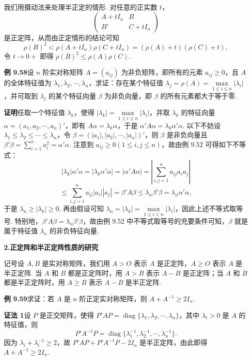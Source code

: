 \documentclass[UTF8, 12pt, fontset=fandol, oneside]{ctexart}
\begin{document}
我们用摄动法来处理半正定的情形. 对任意的正实数 $t$，
\[
\begin{pmatrix}
A+tI_n&B\\
B'&C+tI_n
\end{pmatrix}
\]
是正定阵，从而由正定情形的结论可知
\[
\rho(B)^2<\rho(A+tI_n)\rho(C+tI_n)=(\rho(A)+t)(\rho(C)+t),
\]
令 $t\to0+$ 即得 $\rho(B)^2\le\rho(A)\rho(C)$.

\noindent\textbf{例 9.58}\quad 设 $n$ 阶实对称矩阵 $A=(a_{ij})$ 为非负矩阵，即所有的元素 $a_{ij}\ge0$，且 $A$ 的全体特征值为 $\lambda_1,\lambda_2,\cdots,\lambda_n$，求证：存在某个特征值 $\lambda_j=\rho(A)=\max\limits_{1\le i\le n}|\lambda_i|$，并可取到 $\lambda_j$ 的某个特征向量 $\beta$ 为非负向量，即 $\beta$ 的所有元素都大于等于零.

\noindent\textbf{证明}\quad 任取一个特征值 $\lambda_k$，使得 $|\lambda_k|=\max\limits_{1\le i\le n}|\lambda_i|$，并取 $\lambda_k$ 的特征向量 $\alpha=(a_1,a_2,\cdots,a_n)'$，即有 $A\alpha=\lambda_k\alpha$，于是 $\alpha'A\alpha=\lambda_k\alpha'\alpha$. 以下不妨设 $\lambda_1\le\lambda_2\le\cdots\le\lambda_n$，令 $\beta=(|a_1|,|a_2|,\cdots,|a_n|)'$，则 $\beta$ 是非负向量且 $\beta'\beta=\sum_{i=1}^na_i^2=\alpha'\alpha$. 注意到 $a_{ij}\ge0(1\le i,j\le n)$，故由例 9.52 可得如下不等式：
\[
|\lambda_k|\alpha'\alpha=|\lambda_k\alpha'\alpha|=|\alpha'A\alpha|=
\left|\sum_{i,j=1}^na_{ij}a_ia_j\right|
\]
\[
\le\sum_{i,j=1}^na_{ij}|a_i||a_j|=\beta'A\beta\le\lambda_n\beta'\beta=\lambda_n\alpha'\alpha,
\]
于是 $\lambda_n\ge|\lambda_k|\ge0$. 再由假设可知 $\lambda_n=|\lambda_k|=\max\limits_{1\le i\le n}|\lambda_i|$，因此上述不等式取等号. 特别地，$\beta'A\beta=\lambda_n\beta'\beta$，故由例 9.52 中不等式取等号的充要条件可知，$\beta$ 就是属于特征值 $\lambda_n$ 的非负特征向量.

\noindent\textbf{2.\quad 正定阵和半正定阵性质的研究}

记号\quad 设 $A,B$ 是实对称矩阵，我们用 $A>O$ 表示 $A$ 是正定阵，$A\ge O$ 表示 $A$ 是半正定阵. 当 $A$ 和 $B$ 都是正定阵时，用 $A>B$ 表示 $A-B$ 是正定阵；当 $A$ 和 $B$ 都是半正定阵时，用 $A\ge B$ 表示 $A-B$ 是半正定阵.

\noindent\textbf{例 9.59}\quad 求证：若 $A$ 是 $n$ 阶正定实对称矩阵，则 $A+A^{-1}\ge2I_n$.

\noindent\textbf{证法 1}\quad 设 $P$ 是正交矩阵，使得 $P'AP=\operatorname{diag}\{\lambda_1,\lambda_2,\cdots,\lambda_n\}$，其中 $\lambda_i>0$ 是 $A$ 的特征值，则
\[
P'A^{-1}P=\operatorname{diag}\{\lambda_1^{-1},\lambda_2^{-1},\cdots,\lambda_n^{-1}\}.
\]
因为 $\lambda_i+\lambda_i^{-1}\ge2$，故 $P'AP+P'A^{-1}P-2I_n$ 是半正定阵，由此即得 $A+A^{-1}\ge2I_n$.
\end{document}
